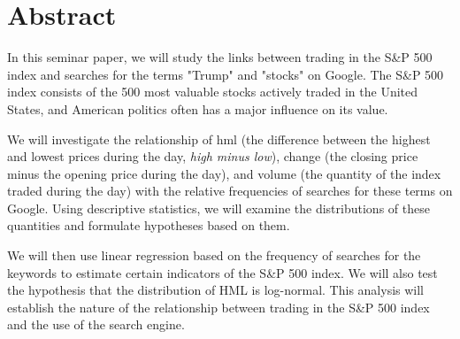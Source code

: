 \documentclass[../main.tex]{subfiles}
\begin{document}
\newpage
{} %
\section{Abstract}

In this seminar paper, we will study the links between trading in the S\&P 500 index and searches for the terms "Trump" and "stocks" on Google. The S\&P 500 index consists of the 500 most valuable stocks actively traded in the United States, and American politics often has a major influence on its value.

We will investigate the relationship of hml (the difference between the highest and lowest prices during the day, \textit{high minus low}), change (the closing price minus the opening price during the day), and volume (the quantity of the index traded during the day) with the relative frequencies of searches for these terms on Google. Using descriptive statistics, we will examine the distributions of these quantities and formulate hypotheses based on them.

We will then use linear regression based on the frequency of searches for the keywords to estimate certain indicators of the S\&P 500 index.
We will also test the hypothesis that the distribution of HML is log-normal.
This analysis will establish the nature of the relationship between trading in the S\&P 500 index and the use of the search engine.

\end{document}
